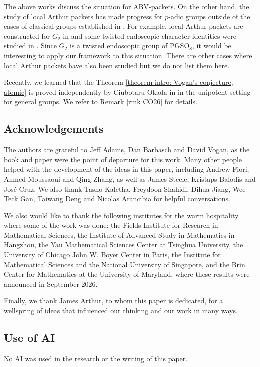 \documentclass[11pt,letterpaper]{amsart}
\numberwithin{equation}{section}
\begin{document}
The above works discuss the situation for ABV-packets. On the other hand, the study of local Arthur packets has made progress for $p$-adic groups outside of the cases of classical groups established in \cites{Art13,KMSW14,Mok15,AG17,MR18,Ish24}. For example, local Arthur packets are constructed for $G_2$ in \cites{GGJ02, GG06, AHRR24} and some twisted endoscopic character identities were studied in \cite{Tak26}. Since $G_2$ is a twisted endoscopic group of $\mathrm{PGSO}_8$, it would be interesting to apply our framework to this situation. There are other cases where local Arthur packets have also been studied but we do not list them here.

Recently, we learned that the Theorem \ref{theorem intro: Vogan's conjecture, atomic} is proved independently by Ciubotaru-Okada in \cite{CO26} in the unipotent setting for general groups. We refer to Remark \ref{rmk CO26} for details.



\subsection*{Acknowledgements}
The authors are grateful to Jeff Adams, Dan Barbasch and David Vogan, as the book \cite{ABV92} and paper \cite{Vog93} were the point of departure for this work. 
Many other people helped with the development of the ideas in this paper, including Andrew Fiori, Ahmed Moussaoui and Qing Zhang, as well as James Steele, Kristaps Balodis and José Cruz. 
We also thank Tasho Kaletha, Freydoon Shahidi, Dihua Jiang, Wee Teck Gan, Taiwang Deng and Nicolas Arancibia for helpful conversations. 

We also would like to thank the following institutes for the warm hospitality where some of the work was done: the Fields Institute for
Research in Mathematical Sciences, the Institute of Advanced Study in Mathematics in Hangzhou, the Yau Mathematical Sciences Center at Tsinghua University, the University of Chicago John W. Boyer Center in Paris, the Institute for Mathematical Sciences and the National University of Singapore, and the Brin Center for Mathematics at the University of Maryland, where these results were announced in September 2026. 

Finally, we thank James Arthur, to whom this paper is dedicated, for a wellspring of ideas that influenced our thinking and our work in many ways.

\subsection*{Use of AI}
No AI was used in the research or the writing of this paper.
\end{document}
